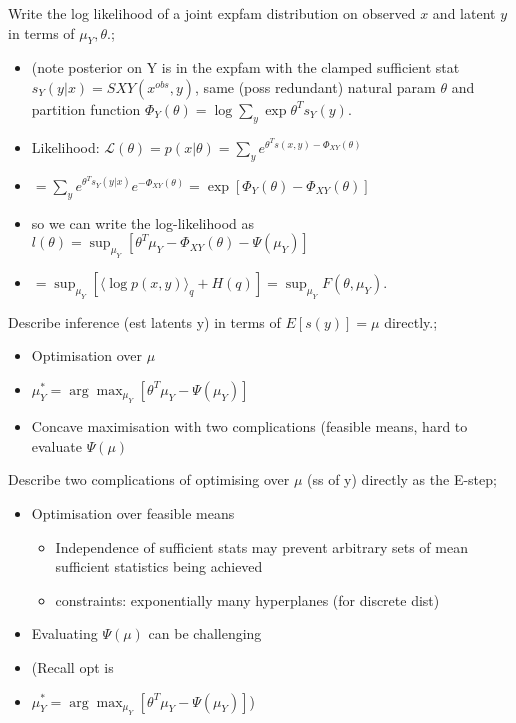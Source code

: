 \documentclass{article}
\begin{document}

Write the log likelihood of a joint expfam distribution on observed $x$ and latent $y$ in terms of $\mu_Y, \theta$.; \begin{itemize}
    \item (note posterior on Y is in the expfam with the clamped sufficient stat $s_Y(y|x) = S{XY}(x^{obs}, y)$, same (poss redundant) natural param $\theta$ and partition function $\Phi_Y(\theta) = \log \sum_y \exp \theta^Ts_Y(y)$.
    \item Likelihood: $\mathcal{L}(\theta) = p(x|\theta) = \sum_y e^{\theta^Ts(x,y) - \Phi_{XY}(\theta)}$
    \item $= \sum_y e^{\theta^Ts_Y(y|x)}e^{-\Phi_{XY}(\theta)} = \exp[\Phi_Y(\theta) - \Phi_{XY}(\theta)]$
    \item so we can write the log-likelihood as $l(\theta) = \sup_{\mu_Y}[\theta^T\mu_Y - \Phi_{XY}(\theta) - \Psi(\mu_Y)]$
    \item $=\sup_{\mu_Y}[\langle \log p(x, y)\rangle_q + H(q)] = \sup_{\mu_Y}F(\theta, \mu_Y)$.
\end{itemize}

Describe inference (est latents y) in terms of $E[s(y)] = \mu$ directly.; \begin{itemize}
    \item Optimisation over $\mu$
    \item $\mu^*_Y = \arg\max_{\mu_Y}[\theta^T\mu_Y - \Psi(\mu_Y)]$
    \item Concave maximisation with two complications (feasible means, hard to evaluate $\Psi(\mu)$
\end{itemize}

Describe two complications of optimising over $\mu$ (ss of y) directly as the E-step; \begin{itemize}
    \item Optimisation over feasible means \begin{itemize}
        \item Independence of sufficient stats may prevent arbitrary sets of mean sufficient statistics being achieved
        \item constraints: exponentially many hyperplanes (for discrete dist)
    \end{itemize}
    \item Evaluating $\Psi(\mu)$ can be challenging
    \item (Recall opt is \item $\mu^*_Y = \arg\max_{\mu_Y}[\theta^T\mu_Y - \Psi(\mu_Y)]$)
\end{itemize}
\end{document}
